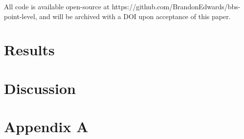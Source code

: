 \documentclass[12pt]{article}
\begin{document}
\par All code is available open-source at https://github.com/BrandonEdwards/bbs-point-level, and will be archived with a DOI upon acceptance of this paper.

\section{Results}

\section{Discussion}


	
	
\section{Appendix A}
\end{document}
